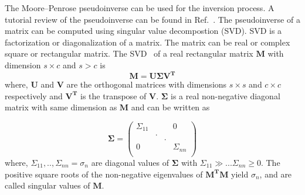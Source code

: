 

The Moore--Penrose pseudoinverse can be used for the inversion process. A tutorial review of the pseudoinverse can be found in Ref.~\cite{pseudo}. The pseudoinverse of a matrix can be computed using singular value decompostion (SVD). SVD is a factorization or diagonalization of a matrix. The matrix can be real or complex square or rectangular matrix. The SVD~\cite{svd2,svd3} of a real rectangular matrix $\bm{M}$ with dimension $s \times c$ and $s>c$ is 
\begin{equation}\label{eq:m}
        \bm{M} = \bm{U} \bm{\Sigma} \bm{V^T}
\end{equation}
where, $\bm{U}$ and $\bm{V}$ are the orthogonal matrices with dimensions $s \times s$ and $c \times c$ respectively and $\bm{V^T}$ is the transpose of $\bm{V}$. $\bm{\Sigma}$ is a real non-negative diagonal matrix with same dimension as  $\bm{M}$ and can be written as

\begin{equation*}
\bm{\Sigma} = \begin{pmatrix} 
\Sigma_{11} &  &  & 0 \\
  & . &  &  \\
  &   & . &  \\

0 &  &  & \Sigma_{nn} \\
 \end{pmatrix}
\end{equation*}
where, $\Sigma_{11},..,\Sigma_{nn}=\sigma_{n}$ are diagonal values of $\bm{\Sigma}$ with $\Sigma_{11}\gg... \Sigma_{nn}\geq0$. The positive square roots of the non-negative eigenvalues of $\bm{M^T}\bm{M}$ yield $\sigma_{n}$, and are called singular values of $\bm{M}$. 

